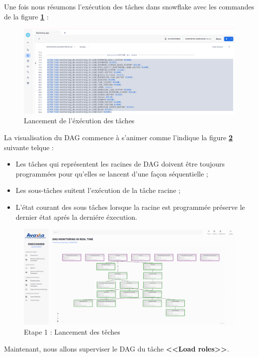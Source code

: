 \par Une fois nous résumons l'exécution des tâches dans snowflake avec les commandes de la figure \textbf{\ref{fig:resume}} :
\begin{figure}[H]
    \centering
    \includegraphics[width =1\linewidth]{img/captures/dag/resume.png}
    \caption{Lancement de l'éxécution des tâches}
    \label{fig:resume}
\end{figure}
\par La visualisation du DAG commence à s'animer comme l'indique la figure \textbf{\ref{fig:sus}} suivante telque :
\begin{itemize}
    \item Les tâches qui représentent les racines de DAG doivent être toujours programmées pour qu'elles se lancent d'une façon séquentielle ;
    \item Les sous-tâches suitent l'exécution de la tâche racine ;
    \item L'état courant des sous tâches lorsque la racine est programmée préserve le dernier état aprés la derniére éxecution.
\end{itemize}
\begin{figure}[H]
    \centering
    \includegraphics[width =1\linewidth]{img/captures/dag/scheduled.png}
    \caption{Etape 1 : Lancement des têches}
    \label{fig:sus}
\end{figure}
\par Maintenant, nous allons superviser le DAG du tâche \textbf{<<Load roles>>}. \\
